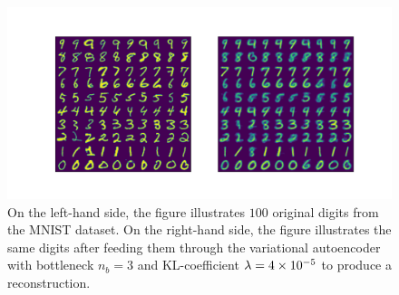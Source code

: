 \begin{figure}
\begin{center}
      \includegraphics[trim = 15mm 10mm 15mm 15mm, clip, width=\linewidth]{convolutional_VAE_snd_KL_4e-5_10k_epochs_3D_inference}
\end{center}
\caption{On the left-hand side, the figure illustrates $100$ original digits from the MNIST dataset. On the right-hand side, the figure illustrates the same digits after feeding them through the variational autoencoder with bottleneck $n_b=3$ and KL-coefficient $\lambda = \num{4e-5}$ to produce a reconstruction.}\label{fig:convolutional_VAE_snd_KL_4e-5_10k_epochs_3D_inference}
\end{figure}


